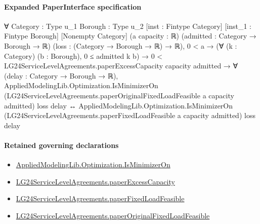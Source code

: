 \documentclass[10pt]{article}
\begin{document}
\paragraph{Expanded PaperInterface specification}
\begin{ReviewVerbatim}
∀ {Category : Type u_1} {Borough : Type u_2} [inst : Fintype Category] [inst_1 : Fintype Borough] [Nonempty Category]
  (a capacity : ℝ) (admitted : Category → Borough → ℝ) (loss : (Category → Borough → ℝ) → ℝ),
  0 < a →
    (∀ (k : Category) (b : Borough), 0 ≤ admitted k b) →
      0 < LG24ServiceLevelAgreements.paperExcessCapacity capacity admitted →
        ∀ (delay : Category → Borough → ℝ),
          AppliedModelingLib.Optimization.IsMinimizerOn
              (LG24ServiceLevelAgreements.paperOriginalFixedLoadFeasible a capacity admitted) loss delay ↔
            AppliedModelingLib.Optimization.IsMinimizerOn
              (LG24ServiceLevelAgreements.paperFixedLoadFeasible a capacity admitted) loss delay
\end{ReviewVerbatim}

\paragraph{Retained governing declarations}
\begin{itemize}\raggedright
\item \hyperlink{governing-declaration-797bcd85b4b26271}{Applied\allowbreak{}Modeling\allowbreak{}Lib.\allowbreak{}Optimization.\allowbreak{}Is\allowbreak{}Minimizer\allowbreak{}On}
\item \hyperlink{governing-declaration-cfc6c9e8c89655cd}{LG24\allowbreak{}Service\allowbreak{}Level\allowbreak{}Agreements.\allowbreak{}paper\allowbreak{}Excess\allowbreak{}Capacity}
\item \hyperlink{governing-declaration-862f3b4b0c8cef67}{LG24\allowbreak{}Service\allowbreak{}Level\allowbreak{}Agreements.\allowbreak{}paper\allowbreak{}Fixed\allowbreak{}Load\allowbreak{}Feasible}
\item \hyperlink{governing-declaration-e3531f1e570407cd}{LG24\allowbreak{}Service\allowbreak{}Level\allowbreak{}Agreements.\allowbreak{}paper\allowbreak{}Original\allowbreak{}Fixed\allowbreak{}Load\allowbreak{}Feasible}
\end{itemize}
\end{document}
